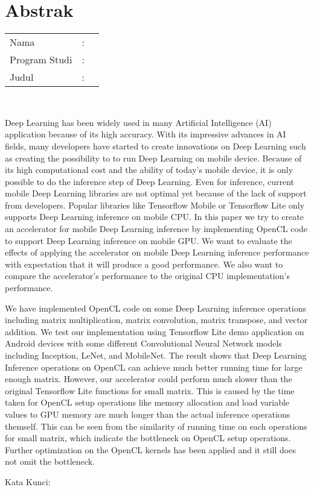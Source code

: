 %
%
%

\chapter*{Abstrak}

\vspace*{0.2cm}

\noindent \begin{tabular}{l l p{10cm}}
	Nama&: & \penulis \\
	Program Studi&: & \program \\
	Judul&: & \judul \\
\end{tabular} \\ 

\vspace*{0.5cm}

\noindent 
Deep Learning has been widely used in many Artificial Intelligence (AI) application because of its high accuracy. With its impressive advances in AI fields, many developers have started to create innovations on Deep Learning such as creating the possibility to to run Deep Learning on mobile device. Because of its high computational cost and the ability of today's mobile device, it is only possible to do the inference step of Deep Learning. Even for inference, current mobile Deep Learning libraries are not optimal yet because of the lack of support from developers. Popular libraries like Tensorflow Mobile or Tensorflow Lite only supports Deep Learning inference on mobile CPU. In this paper we try to create an accelerator for mobile Deep Learning inference by implementing OpenCL code to support Deep Learning inference on mobile GPU. We want to evaluate the effects of applying the accelerator on mobile Deep Learning inference performance with expectation that it will produce a good performance. We also want to compare the accelerator’s performance to the original CPU implementation’s performance. 

We have implemented OpenCL code on some Deep Learning inference operations including matrix multiplication, matrix convolution, matrix transpose, and vector addition. We test our implementation using Tensorflow Lite demo application on Android devices with some different Convolutional Neural Network models including Inception, LeNet, and MobileNet. The result shows that Deep Learning Inference operations on OpenCL can achieve much better running time for large enough matrix. However, our accelerator could perform much slower than the original Tensorflow Lite functions for small matrix. This is caused by the time taken for OpenCL setup operations like memory allocation and load variable values to GPU memory are much longer than the actual inference operations themself. This can be seen from the similarity of running time on each operations for small matrix, which indicate the bottleneck on OpenCL setup operations. Further optimization on the OpenCL kernels has been applied and it still does not omit the bottleneck.
\\

\vspace*{0.2cm}

\noindent Kata Kunci: \\ 
\noindent {} \\

\newpage